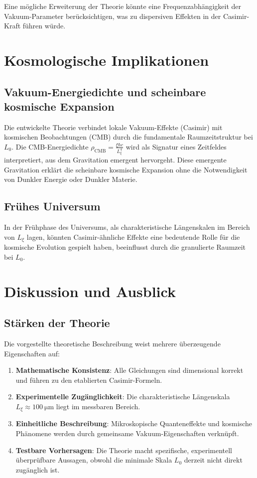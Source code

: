 \documentclass[12pt,a4paper]{article}
\begin{document}
	Eine mögliche Erweiterung der Theorie könnte eine Frequenzabhängigkeit der Vakuum-Parameter berücksichtigen, was zu dispersiven Effekten in der Casimir-Kraft führen würde.
	
	\section{Kosmologische Implikationen}
	
	\subsection{Vakuum-Energiedichte und scheinbare kosmische Expansion}
	
	Die entwickelte Theorie verbindet lokale Vakuum-Effekte (Casimir) mit kosmischen Beobachtungen (CMB) durch die fundamentale Raumzeitstruktur bei \( L_0 \). Die CMB-Energiedichte \( \rho_{\text{CMB}} = \frac{\xi \hbar c}{L_\xi^4} \) wird als Signatur eines Zeitfeldes interpretiert, aus dem Gravitation emergent hervorgeht. Diese emergente Gravitation erklärt die scheinbare kosmische Expansion ohne die Notwendigkeit von Dunkler Energie oder Dunkler Materie.
	
	\subsection{Frühes Universum}
	
	In der Frühphase des Universums, als charakteristische Längenskalen im Bereich von \( L_\xi \) lagen, könnten Casimir-ähnliche Effekte eine bedeutende Rolle für die kosmische Evolution gespielt haben, beeinflusst durch die granulierte Raumzeit bei \( L_0 \).
	
	\section{Diskussion und Ausblick}
	
	\subsection{Stärken der Theorie}
	
	Die vorgestellte theoretische Beschreibung weist mehrere überzeugende Eigenschaften auf:
	
	\begin{enumerate}
		\item \textbf{Mathematische Konsistenz}: Alle Gleichungen sind dimensional korrekt und führen zu den etablierten Casimir-Formeln.
		\item \textbf{Experimentelle Zugänglichkeit}: Die charakteristische Längenskala \( L_\xi \approx \SI{100}{\micro\meter} \) liegt im messbaren Bereich.
		\item \textbf{Einheitliche Beschreibung}: Mikroskopische Quanteneffekte und kosmische Phänomene werden durch gemeinsame Vakuum-Eigenschaften verknüpft.
		\item \textbf{Testbare Vorhersagen}: Die Theorie macht spezifische, experimentell überprüfbare Aussagen, obwohl die minimale Skala \( L_0 \) derzeit nicht direkt zugänglich ist.
	\end{enumerate}
	
\end{document}
